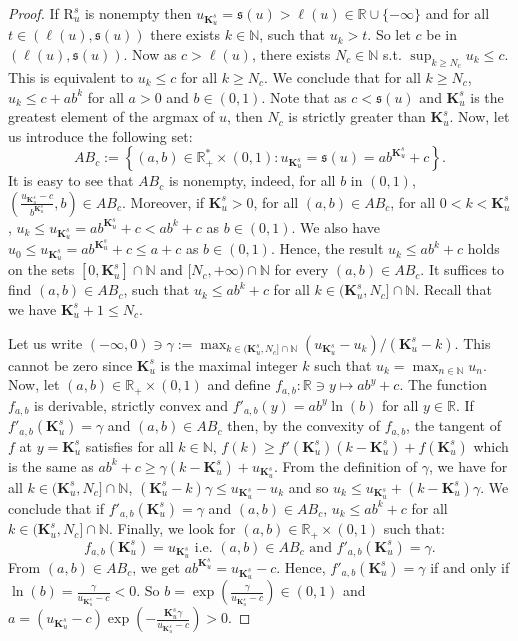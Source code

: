 \documentclass[10pt,a4paper]{amsart}
\def\bigks{\mathbf{K}^s}
\def\gls#1{{\mathrm R}_{#1}}
\def\gsls#1{\gls{#1}^s}
\def\ls#1{\boldsymbol{\ell}(#1)}
\def\nn{\mathbb N}
\def\red#1{#1}
\def\rr{\mathbb R}
\def\valu#1{\mathfrak{s}(#1)}
\begin{document}
	\begin{proof}
		If $\gsls{u}$ is nonempty then $u_{\bigks_u}=\valu{u}>\ls{u}\in\rr\cup\{-\infty\}$ and for all $t\in (\ls{u},\valu{u})$ there exists 
		$k\in\nn$, such that $u_k>t$. So let $c$ be in $(\ls{u},\valu{u})$. Now as $c>\ls{u}$, there exists $N_c\in\nn$ s.t. $\sup_{k\geq N_c} u_k\leq c$. This is equivalent to $u_k\leq c$ for all $k\geq N_c$. We conclude that for all $k\geq N_c$, $u_k\leq c+ab^k$ for all $a>0$ and $b\in (0,1)$. Note that as $c<\valu{u}$ and $\bigks_u$ is the greatest element of the argmax of $u$, then $N_c$ is strictly greater than $\bigks_u$. Now, let us introduce the following set: 
		\[
		{AB}_c:= \left\{(a,b)\in\rr_+^* \times (0,1): u_{\bigks_u}=\valu{u}=a b^{\bigks_u}+c\right\}.
		\] 
		It is easy to see that ${AB}_c$ is nonempty, indeed, for all $b$ in $(0,1)$, $(\frac{u_{\bigks_u}-c}{b^{\bigks_u}},b)\in {AB}_c$. Moreover, if $\bigks_u>0$, for all $(a,b)\in {AB}_c$,
		for all $0<k< \bigks_u$, $u_k\leq u_{\bigks_u}=a b^{\bigks_u}+c<a b^k+c$ as $b\in (0,1)$. We also have $u_0\leq u_{\bigks_u}=ab^{\bigks_u}+c\leq a+c$ as $b\in (0,1)$. Hence, the result $u_k\leq ab^k+c$ holds on the sets $[0,\bigks_u]\cap \nn$ and $[N_c,+\infty)\cap\nn$ for every $(a,b)\in {AB}_c$. It suffices to find $(a,b)\in {AB}_c$, such that $u_k\leq ab^k+c$ for all $k\in (\bigks_u,N_c]\cap \nn$. Recall that we have $\bigks_u+1\leq N_c$.
		
		Let us write $(-\infty,0)\ni\gamma:=\max_{k\in (\bigks_u,N_c]\cap\nn} (u_{\bigks_u}-u_k)/(\bigks_u-k)$. This cannot be zero since $\bigks_u$ is the maximal integer $k$ such that $u_k=\max_{n\in\nn} u_n$. Now, let $(a,b)\in \rr_+\times (0,1)$ and define $f_{a,b}:\rr\ni y\mapsto a b^y+c$. The function $f_{a,b}$ is derivable, strictly convex and $f'_{a,b}(y)=ab^y\ln(b)$ for all $y\in\rr$. If $f'_{a,b}(\bigks_u)=\gamma$ and $(a,b)\in {AB}_c$ then, by the convexity of $f_{a,b}$, the tangent of $f$ at $y=\bigks_u$ satisfies for all $k\in\nn$, $f(k)\geq f'(\bigks_u)(k-\bigks_u)+f(\bigks_u)$ which is the same as $ab^k+c\geq \gamma (k-\bigks_u)+u_{\bigks_u}$. \red{From the} definition of $\gamma$, we have for all $k\in (\bigks_u,N_c\red{]\cap \nn}$, $(\bigks_u-k)\gamma\leq u_{\bigks_u}-u_k$ and so $u_k\leq u_{\bigks_u}+(k-\bigks_u)\gamma$. We conclude that if $f'_{a,b}(\bigks_u)=\gamma$ and $(a,b)\in {AB}_c$, $u_k\leq ab^k+c$ for all $k\in (\bigks_u,N_c]\red{\cap\nn}$. Finally, we look for $(a,b)\in \rr_+\times (0,1)$ such that:
		\[
		f_{a,b}(\bigks_u)=u_{\bigks_u} \text{ i.e. } (a,b)\in {AB}_c\text{ and } f'_{a,b}(\bigks_u)=\gamma.
		\]
		From $(a,b)\in {AB}_c$, we get $ab^{\bigks_u}=u_{\bigks_u}-c$. Hence, $f'_{a,b}(\bigks_u)=\gamma$ if and only if $\ln(b)=\frac{\gamma}{u_{\bigks_u}-c}<0$. So $b=\exp(\frac{\gamma}{u_{\bigks_u}-c})\in (0,1)$ and $a=(u_{\bigks_u}-c)\exp(-\frac{\bigks_u\gamma}{u_{\bigks_u}-c})>0$.
	\end{proof}
\end{document}
